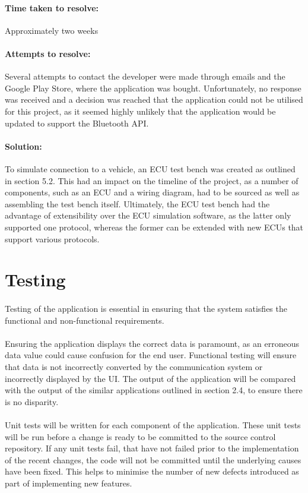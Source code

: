 		\paragraph{Time taken to resolve:}{
		Approximately two weeks
		}
		\paragraph{Attempts to resolve:}{
		Several attempts to contact the developer were made through emails and the Google Play Store, where the application was bought. Unfortunately, no response was received and a decision was reached that the application could not be utilised for this project, as it seemed highly unlikely that the application would be updated to support the Bluetooth API. 
		}
		\paragraph{Solution:}{
		To simulate connection to a vehicle, an ECU test bench was created as outlined in section 5.2. This had an impact on the timeline of the project, as a number of components, such as an ECU and a wiring diagram, had to be sourced as well as assembling the test bench itself. Ultimately, the ECU test bench had the advantage of extensibility over the ECU simulation software, as the latter only supported one protocol, whereas the former can be extended with new ECUs that support various protocols.
		}
	
\section{Testing}
	\paragraph{}{
	Testing of the application is essential in ensuring that the system satisfies the functional and non-functional requirements.
	}
	\paragraph{}{
	Ensuring the application displays the correct data is paramount, as an erroneous data value could cause confusion for the end user. Functional testing will ensure that data is not incorrectly converted by the communication system or incorrectly displayed by the UI. The output of the application will be compared with the output of the similar applications outlined in section 2.4, to ensure there is no disparity. 
	}
	\paragraph{}{
	Unit tests will be written for each component of the application. These unit tests will be run before a change is ready to be committed to the source control repository. If any unit tests fail, that have not failed prior to the implementation of the recent changes, the code will not be committed until the underlying causes have been fixed. This helps to minimise the number of new defects introduced as part of implementing new features.
	}